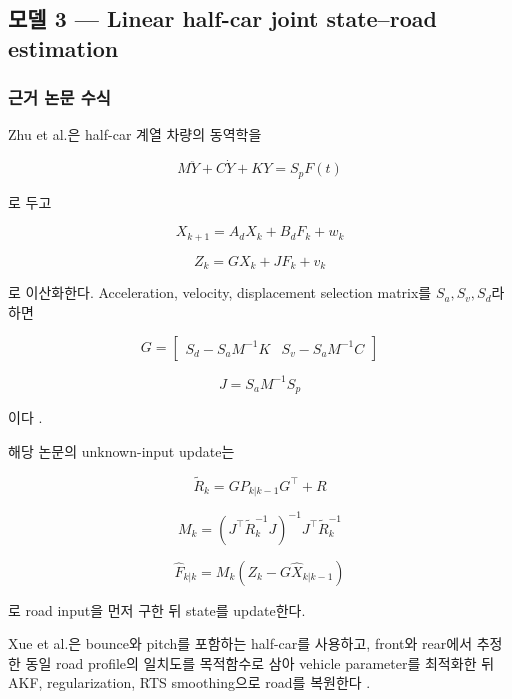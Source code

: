 \documentclass[letterpaper,10pt,journal,twocolumn]{ieeeconf}
\begin{document}
\subsection{모델 3 --- Linear half-car joint state--road estimation}

\subsubsection{근거 논문 수식}

Zhu et al.은 half-car 계열 차량의 동역학을

\[
M\ddot Y+C\dot Y+KY=S_pF(t)
\]

로 두고

\[
X_{k+1}
=
A_dX_k+B_dF_k+w_k
\]

\[
Z_k
=
GX_k+JF_k+v_k
\]

로 이산화한다. Acceleration, velocity, displacement selection matrix를 \(S_a,S_v,S_d\)라 하면

\[
G
=
\begin{bmatrix}
S_d-S_aM^{-1}K&
S_v-S_aM^{-1}C
\end{bmatrix}
\]

\[
J=S_aM^{-1}S_p
\]

이다 \cite[eqs.~(7)--(13)]{zhu2022}.

해당 논문의 unknown-input update는

\[
\widetilde R_k
=
GP_{k|k-1}G^\top+R
\]

\[
M_k
=
\left(
J^\top\widetilde R_k^{-1}J
\right)^{-1}
J^\top\widetilde R_k^{-1}
\]

\[
\hat F_{k|k}
=
M_k
\left(
Z_k-G\hat X_{k|k-1}
\right)
\]

로 road input을 먼저 구한 뒤 state를 update한다.

Xue et al.은 bounce와 pitch를 포함하는 half-car를 사용하고, front와 rear에서 추정한 동일 road profile의 일치도를 목적함수로 삼아 vehicle parameter를 최적화한 뒤 AKF, regularization, RTS smoothing으로 road를 복원한다 \cite{xue2020}.
\end{document}
